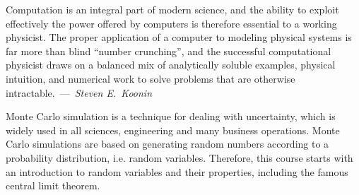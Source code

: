 \documentclass[12pt]{mcplain}
\begin{document}
\begin{leftindent}[0.5in]
 \footnotesize
 Computation is an integral part of modern science, and the ability to exploit
 effectively the power offered by computers is therefore essential to a working
 physicist.  The proper application of a computer to modeling physical systems
 is far more than blind ``number crunching'', and the successful computational
 physicist draws on a balanced mix of analytically soluble examples, physical
 intuition, and numerical work to solve problems that are otherwise
 intractable.~---~\textit{Steven E.~Koonin}
\end{leftindent}
%
%

Monte Carlo simulation is a technique for dealing with uncertainty, which is widely used in all sciences, engineering and many business operations. Monte Carlo simulations are based on generating random numbers according to a probability distribution, i.e. random variables. Therefore, this course starts with an introduction to random variables and their properties, including the famous central limit theorem.\\
\end{document}
